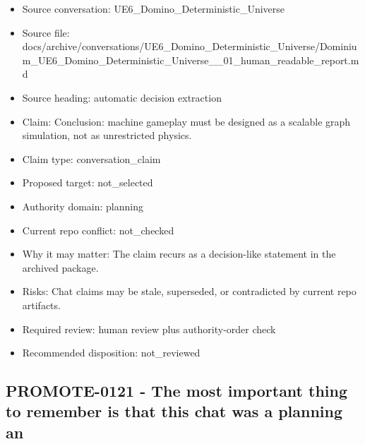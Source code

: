 \documentclass[11pt,a4paper]{report}
\begin{document}
\begin{itemize}
\item Source conversation: UE6\_Domino\_Deterministic\_Universe
\item Source file: docs/archive/conversations/UE6\_Domino\_Deterministic\_Universe/Dominium\_UE6\_Domino\_Deterministic\_Universe\_\_01\_human\_readable\_report.md
\item Source heading: automatic decision extraction
\item Claim: Conclusion: machine gameplay must be designed as a scalable graph simulation, not as unrestricted physics.
\item Claim type: conversation\_claim
\item Proposed target: not\_selected
\item Authority domain: planning
\item Current repo conflict: not\_checked
\item Why it may matter: The claim recurs as a decision-like statement in the archived package.
\item Risks: Chat claims may be stale, superseded, or contradicted by current repo artifacts.
\item Required review: human review plus authority-order check
\item Recommended disposition: not\_reviewed
\end{itemize}

\subsection{PROMOTE-0121 - The most important thing to remember is that this chat was a planning an}
\end{document}
